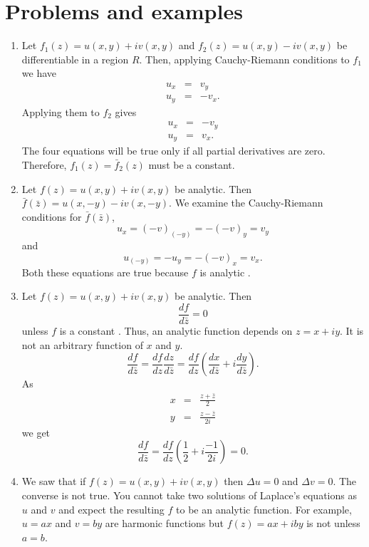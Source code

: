 \section{Problems and examples}\label{c2s3}
\begin{enumerate}
\item Let $f_1(z) = u(x, y) + iv(x, y)$ and $f_2(z) = u(x, y) - iv(x, y)$ be
differentiable in a region $R$. Then, applying Cauchy-Riemann conditions
to $f_1$ we have
\begin{eqnarray*}
u_x &=& v_y \\
u_y &=& -v_x.
\end{eqnarray*}
Applying them to $f_2$ gives
\begin{eqnarray*}
u_x &=& -v_y \\
u_y &=& v_x.
\end{eqnarray*}
The four equations will be true only if all partial derivatives are zero.
Therefore, $f_1(z) = \bar{f}_2(z)$ must be a constant. \cite{aw}

\item Let $f(z) = u(x, y) + iv(x, y)$ be analytic. Then $\bar{f}(\bar{z}) =
u(x, -y) - iv(x, -y)$. We examine the Cauchy-Riemann conditions for $\bar{f}(
\bar{z})$,
\[
u_x = (-v)_{(-y)} = -(-v)_y = v_y
\]
and
\[
u_{(-y)} = -u_y = -(-v)_x = v_x.
\] 
Both these equations are true because $f$ is analytic \cite{aw}.

\item Let $f(z) = u(x, y) + iv(x, y)$ be analytic. Then
\[
\frac{df}{d\bar{z}} = 0
\]
unless $f$ is a constant \cite{aw}. Thus, an analytic function 
depends on $z = x + iy$. It is not an arbitrary function of $x$ and $y$.
\[
\frac{df}{d\bar{z}} = \frac{df}{dz}\frac{dz}{d\bar{z}} = \frac{df}{dz}\left(
\frac{dx}{d\bar{z}} + i\frac{dy}{d\bar{z}}\right).
\]
As
\begin{eqnarray*}
x &=& \frac{z + \bar{z}}{2} \\
y &=& \frac{z - \bar{z}}{2i} 
\end{eqnarray*}
we get
\[
\frac{df}{d\bar{z}} = \frac{df}{dz}\left(\frac{1}{2} + i\frac{-1}{2i}\right)
= 0.
\]

\item We saw that if $f(z) = u(x, y) + iv(x, y)$ then $\Delta u = 0$ and 
$\Delta v = 0$. The converse is not true. You cannot take two solutions of
Laplace's equations as $u$ and $v$ and expect the resulting $f$ to be an 
analytic function. For example, $u = ax$ and $v = by$ are harmonic functions
but $f(z) = ax + iby$ is not unless $a = b$.
\end{enumerate}
